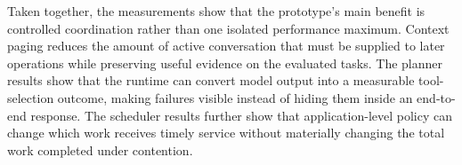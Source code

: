 Taken together, the measurements show that the prototype's main benefit is controlled coordination rather than one isolated performance maximum. Context paging reduces the amount of active conversation that must be supplied to later operations while preserving useful evidence on the evaluated tasks. The planner results show that the runtime can convert model output into a measurable tool-selection outcome, making failures visible instead of hiding them inside an end-to-end response. The scheduler results further show that application-level policy can change which work receives timely service without materially changing the total work completed under contention.


